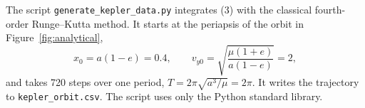 The script \texttt{generate\_kepler\_data.py} integrates (3) with the
classical fourth-order Runge--Kutta method.
It starts at the periapsis of the orbit in Figure~\ref{fig:analytical},
\begin{equation}
  x_0 = a(1-e) = 0.4, \qquad v_{y0} = \sqrt{\frac{\mu(1+e)}{a(1-e)}} = 2,
\end{equation}
and takes 720 steps over one period, $T = 2\pi\sqrt{a^3/\mu} = 2\pi$.
It writes the trajectory to \texttt{kepler\_orbit.csv}.
The script uses only the Python standard library.
